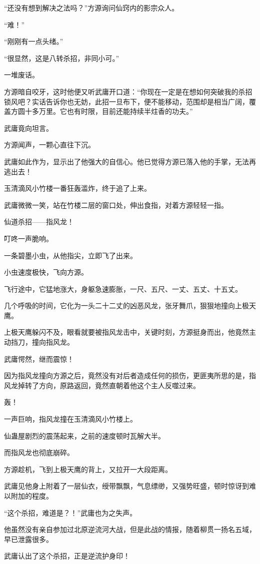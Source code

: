 \begin{this_body}
“还没有想到解决之法吗？”方源询问仙窍内的影宗众人。

“难！”

“刚刚有一点头绪。”

“很显然，这是八转杀招，非同小可。”

一堆废话。

方源暗自咬牙，这时他便又听武庸开口道：“你现在一定是在想如何突破我的杀招锁风吧？实话告诉你也无妨，此招一旦布下，便不能移动，范围却是相当广阔，覆盖方圆十多万里。它也有时限，目前还能持续半炷香的功夫。”

武庸竟向坦言。

方源闻声，一颗心直往下沉。

武庸如此作为，显示出了他强大的自信心。他已觉得方源已落入他的手掌，无法再逃出去！

玉清滴风小竹楼一番狂轰滥炸，终于追了上来。

武庸微微一笑，站在竹楼二层的窗口处，伸出食指，对着方源轻轻一指。

仙道杀招——指风龙！

叮咚一声脆响。

一条碧墨小虫，从他指尖，立即飞了出来。

小虫速度极快，飞向方源。

飞行途中，它猛地涨大，身躯急速膨胀，一尺、五尺、一丈、五丈、十五丈。

几个呼吸的时间，它化为一头二十二丈的凶恶风龙，张牙舞爪，狠狠地撞向上极天鹰。

上极天鹰躲闪不及，眼看就要被指风龙击中，关键时刻，方源挺身而出，他竟然主动挡刀，撞向指风龙。

武庸愕然，继而震惊！

因为指风龙撞向方源之后，竟然没有对后者造成任何的损伤，更匪夷所思的是，指风龙掉转了方向，原路返回，竟然直朝着他这个主人反噬过来。

轰！

一声巨响，指风龙撞在玉清滴风小竹楼上。

仙蛊屋剧烈的震荡起来，之前的速度顿时瓦解大半。

而指风龙也彻底崩碎。

方源趁机，飞到上极天鹰的背上，又拉开一大段距离。

武庸见他身上附着了一层仙衣，绶带飘飘，气息缥缈，又强势旺盛，顿时惊讶到难以附加的程度。

“这个杀招，难道是？！”武庸也为之失声。

他虽然没有亲自参加过北原逆流河大战，但是此战的情报，随着柳贯一扬名五域，早已泄露很多。

武庸认出了这个杀招，正是逆流护身印！


\end{this_body}
